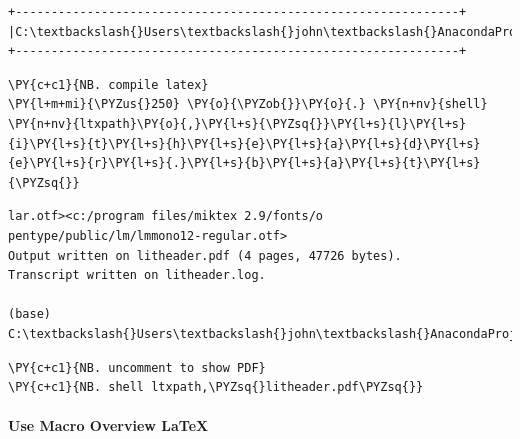     \begin{Verbatim}[commandchars=\\\{\}]
+--------------------------------------------------------------+
|C:\textbackslash{}Users\textbackslash{}john\textbackslash{}AnacondaProjects\textbackslash{}testfolder\textbackslash{}grplit\textbackslash{}litheader.bat|
+--------------------------------------------------------------+
    \end{Verbatim}

    \begin{tcolorbox}[breakable, size=fbox, boxrule=1pt, pad at break*=1mm,colback=cellbackground, colframe=cellborder]
\begin{Verbatim}[commandchars=\\\{\}]
\PY{c+c1}{NB. compile latex}
\PY{l+m+mi}{\PYZus{}250} \PY{o}{\PYZob{}}\PY{o}{.} \PY{n+nv}{shell} \PY{n+nv}{ltxpath}\PY{o}{,}\PY{l+s}{\PYZsq{}}\PY{l+s}{l}\PY{l+s}{i}\PY{l+s}{t}\PY{l+s}{h}\PY{l+s}{e}\PY{l+s}{a}\PY{l+s}{d}\PY{l+s}{e}\PY{l+s}{r}\PY{l+s}{.}\PY{l+s}{b}\PY{l+s}{a}\PY{l+s}{t}\PY{l+s}{\PYZsq{}}
\end{Verbatim}
\end{tcolorbox}

    \begin{Verbatim}[commandchars=\\\{\}]
lar.otf><c:/program files/miktex 2.9/fonts/o
pentype/public/lm/lmmono12-regular.otf>
Output written on litheader.pdf (4 pages, 47726 bytes).
Transcript written on litheader.log.

(base) C:\textbackslash{}Users\textbackslash{}john\textbackslash{}AnacondaProjects\textbackslash{}testfolder\textbackslash{}grplit>endlocal

    \end{Verbatim}

    \begin{tcolorbox}[breakable, size=fbox, boxrule=1pt, pad at break*=1mm,colback=cellbackground, colframe=cellborder]
\begin{Verbatim}[commandchars=\\\{\}]
\PY{c+c1}{NB. uncomment to show PDF}
\PY{c+c1}{NB. shell ltxpath,\PYZsq{}litheader.pdf\PYZsq{}}
\end{Verbatim}
\end{tcolorbox}

    \hypertarget{use-macro-overview-latex}{%
\paragraph{Use Macro Overview LaTeX}\label{use-macro-overview-latex}}

